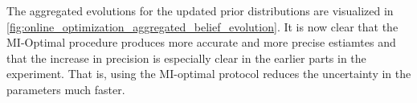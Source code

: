 \documentclass{article}
\begin{document}
The aggregated evolutions for the updated prior distributions are
visualized in \cref{fig:online_optimization_aggregated_belief_evolution}. It is now clear that
the MI-Optimal procedure produces more accurate and more precise estiamtes and
that the increase in precision is especially clear in the earlier parts in the
experiment. That is, using the MI-optimal protocol reduces the uncertainty in
the parameters much faster.
\end{document}
